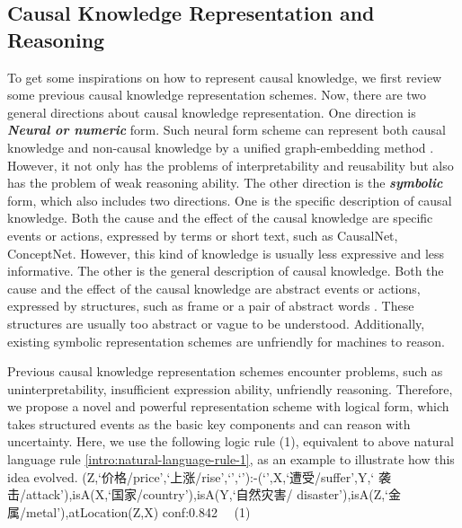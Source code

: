 \subsection{Causal Knowledge Representation and Reasoning}
To get some inspirations on how to represent causal knowledge, we first review some previous causal knowledge representation schemes. Now, there are two general directions about causal knowledge representation. 
One direction is \textbf{\textit{Neural or numeric}} form. Such neural form scheme can represent both causal knowledge and non-causal knowledge by a unified graph-embedding method \cite{Li2016a,Bordes}. However, it not only has the problems of interpretability and reusability but also has the problem of weak reasoning ability.
The other direction is the \textbf{\textit{symbolic}} form, which also includes two directions. One is the specific description of causal knowledge. Both the cause and the effect of the causal knowledge are specific events or actions, expressed by terms or short text, such as CausalNet\cite{Luo2016a}, ConceptNet\cite{Speer2016}. However, this kind of knowledge is usually less expressive and less informative. The other is the general description of causal knowledge. Both the cause and the effect of the causal knowledge are abstract events or actions, expressed by structures, such as frame \cite{BakerCollinFandFillmoreCharlesJandLowe1997} or a pair of abstract words \cite{Zhao2017}. 
These structures are usually too abstract or vague to be understood. Additionally, existing symbolic representation schemes are unfriendly for machines to reason.

Previous causal knowledge representation schemes encounter problems, such as uninterpretability, insufficient expression ability, unfriendly reasoning.
Therefore, we propose a novel and powerful representation scheme with logical form, which takes structured events as the basic key components and can reason with uncertainty. 
Here, we use the following logic rule (1), equivalent to above natural language rule \ref{intro:natural-language-rule-1}, as an example to illustrate how this idea evolved. 
(Z,`价格/price',`上涨/rise',`',`'):-(`',X,`遭受/suffer',Y,` 袭击/attack'),isA(X,`国家/country'),isA(Y,`自然灾害/ disaster'),isA(Z,`金属/metal'),atLocation(Z,X) conf:0.842 \ \ (1)

